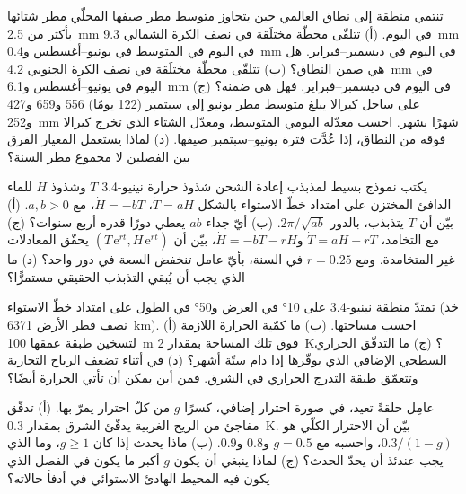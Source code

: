 \begin{exercise}[$\star\star$]\label{exo:b2:climate-variability:9}
تنتمي منطقة إلى نطاق  العالمي حين يتجاوز متوسط مطر صيفها المحلّي مطر
شتائها بأكثر من \qty{2.5}{mm} في اليوم. (أ) تتلقّى محطّة مختلَقة في نصف الكرة
الشمالي \qty{9.3}{mm} في اليوم في المتوسط في يونيو--أغسطس و\qty{0.4}{mm} في اليوم في
ديسمبر--فبراير. هل هي ضمن النطاق؟ (ب) تتلقّى محطّة مختلَقة في نصف الكرة الجنوبي
\qty{4.2}{mm} في اليوم في يونيو--أغسطس و\qty{6.1}{mm} في اليوم في ديسمبر--فبراير. فهل
هي ضمنه؟ (ج) على ساحل كيرالا يبلغ متوسط مطر يونيو إلى سبتمبر (122 يومًا) 556 و659 و427
و\qty{252}{mm} شهرًا بشهر. احسب معدّله اليومي المتوسط، ومعدّل الشتاء الذي تخرج كيرالا فوقه
من النطاق، إذا عُدَّت فترة يونيو--سبتمبر صيفها. (د) لماذا يستعمل المعيار
الفرق بين الفصلين لا مجموع مطر السنة؟
\end{exercise}

\begin{exercise}[$\star\star\star$]\label{exo:b2:climate-variability:10}
يكتب نموذج بسيط لمذبذب إعادة الشحن شذوذ حرارة نينيو-3.4 $T$ وشذوذ $H$
للماء الدافئ المختزن على امتداد خطّ الاستواء بالشكل $\dot T = aH$، $\dot H = -bT$، مع $a, b > 0$. (أ) بيّن
أن $T$ يتذبذب، بالدور $2\pi/\sqrt{ab}$. (ب) أيّ جداء $ab$ يعطي دورًا قدره
أربع سنوات؟ (ج) مع التخامد، $\dot T = aH - rT$ و$\dot H = -bT - rH$، بيّن أن
$(T\,\mathrm{e}^{rt}, H\,\mathrm{e}^{rt})$ يحقّق المعادلات غير المتخامدة. ومع $r = 0.25$ في
السنة، بأيّ عامل تنخفض السعة في دور واحد؟ (د) ما الذي يجب أن يُبقي التذبذب
الحقيقي مستمرًّا؟
\end{exercise}

\begin{exercise}[$\star\star\star$]\label{exo:b2:climate-variability:11}
تمتدّ منطقة نينيو-3.4 على \ang{10} في العرض و\ang{50} في الطول على امتداد خطّ الاستواء
(خذ نصف قطر الأرض \qty{6371}{km}). (أ) احسب مساحتها. (ب) ما كمّية الحرارة اللازمة
لتسخين طبقة عمقها \qty{100}{m} فوق تلك المساحة بمقدار \qty{2}{K}؟ (ج) ما التدفّق الحراري السطحي الإضافي
الذي يوفّرها إذا دام ستّة أشهر؟ (د) في أثناء  تضعف الرياح التجارية
وتتعمّق طبقة التدرج الحراري في الشرق. فمن أين يمكن أن تأتي الحرارة أيضًا؟
\end{exercise}

\begin{exercise}[$\star\star\star$]\label{exo:b2:climate-variability:12}
عامِل  حلقةً تعيد، في صورة احترار إضافي، كسرًا $g$ من كلّ
احترار يمرّ بها. (أ) تدفّق مفاجئ من الريح الغربية يدفّئ الشرق بمقدار \qty{0.3}{K}. بيّن
أن الاحترار الكلّي هو $0.3/(1 - g)$، واحسبه مع $g = 0.5$ و0.8 و0.9. (ب) ماذا
يحدث إذا كان $g \geq 1$، وما الذي يجب عندئذ أن يحدّ الحدث؟ (ج) لماذا ينبغي أن يكون $g$ أكبر ما يكون في
الفصل الذي يكون فيه المحيط الهادئ الاستوائي في أدفأ حالاته؟
\end{exercise}

